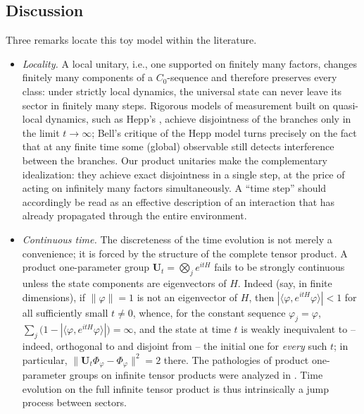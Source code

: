 \documentclass[twoside,11pt,letter]{article}
\theoremstyle{definition}
\theoremstyle{definition}
\theoremstyle{plain}
\begin{document}
\subsection{Discussion}\label{discussionSubsec}

Three remarks locate this toy model within the literature.

\begin{itemize}
\item[(A)] \textit{Locality.} A local unitary, i.e., one supported on finitely many factors, changes finitely many components of a $C_0$-sequence and therefore preserves every class: under strictly local dynamics, the universal state can never leave its sector in finitely many steps. Rigorous models of measurement built on quasi-local dynamics, such as Hepp's \cite{H72}, achieve disjointness of the branches only in the limit $t\to\infty$; Bell's critique \cite{B75} of the Hepp model turns precisely on the fact that at any finite time some (global) observable still detects interference between the branches. Our product unitaries make the complementary idealization: they achieve exact disjointness in a single step, at the price of acting on infinitely many factors simultaneously. A ``time step'' should accordingly be read as an effective description of an interaction that has already propagated through the entire environment.

\item[(B)] \textit{Continuous time.} The discreteness of the time evolution is not merely a convenience; it is forced by the structure of the complete tensor product. A product one-parameter group $\mathbf{U}_t=\bigotimes_j e^{itH}$ fails to be strongly continuous unless the state components are eigenvectors of $H$. Indeed (say, in finite dimensions), if $\|\varphi\|=1$ is not an eigenvector of $H$, then $|\langle\varphi,e^{itH}\varphi\rangle|<1$ for all sufficiently small $t\neq0$, whence, for the constant sequence $\varphi_j=\varphi$, $\sum_j\big(1-|\langle\varphi,e^{itH}\varphi\rangle|\big)=\infty$, and the state at time $t$ is weakly inequivalent to -- indeed, orthogonal to and disjoint from -- the initial one for \emph{every} such $t$; in particular, $\|\mathbf{U}_t\Phi_\varphi-\Phi_\varphi\|^2=2$ there. The pathologies of product one-parameter groups on infinite tensor products were analyzed in \cite{R74}. Time evolution on the full infinite tensor product is thus intrinsically a jump process between sectors.


\end{itemize}
\end{document}

